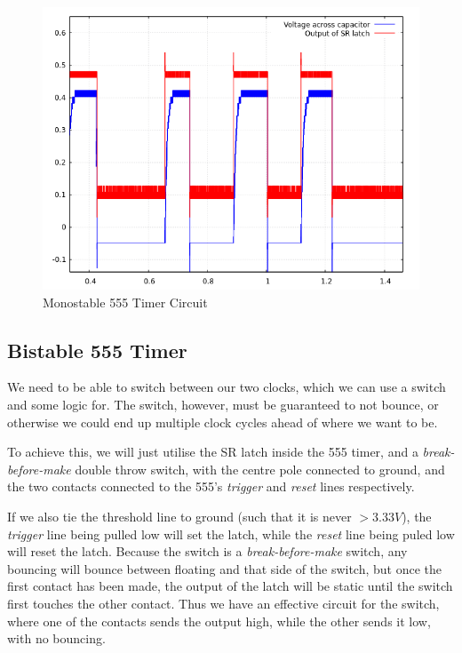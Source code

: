 \documentclass[12pt]{article}
\begin{document}
\begin{FlushLeft}
\begin{figure}[hb]
  \begin{center}
    \includegraphics[width=0.9\linewidth]{../modules/clock/monostable_scope.png}
    \caption{Monostable 555 Timer Circuit}
    \label{fig:monostable_scope}
  \end{center}
\end{figure}


\subsection{Bistable 555 Timer}
We need to be able to switch between our two clocks, which we can use a switch and some logic for. The switch, however, must be guaranteed to not bounce, or otherwise we could end up multiple clock cycles ahead of where we want to be. \\

\vspace{0.3cm}

To achieve this, we will just utilise the SR latch inside the 555 timer, and a \textit{break-before-make} double throw switch, with the centre pole connected to ground, and the two contacts connected to the 555's \textit{trigger} and \textit{reset} lines respectively. \\

\vspace{0.3cm}

If we also tie the threshold line to ground (such that it is never $>3.33V$), the \textit{trigger} line being pulled low will set the latch, while the \textit{reset} line being puled low will reset the latch. Because the switch is a \textit{break-before-make} switch, any bouncing will bounce between floating and that side of the switch, but once the first contact has been made, the output of the latch will be static until the switch first touches the other contact. Thus we have an effective circuit for the switch, where one of the contacts sends the output high, while the other sends it low, with no bouncing. \\



\end{FlushLeft}
\end{document}
